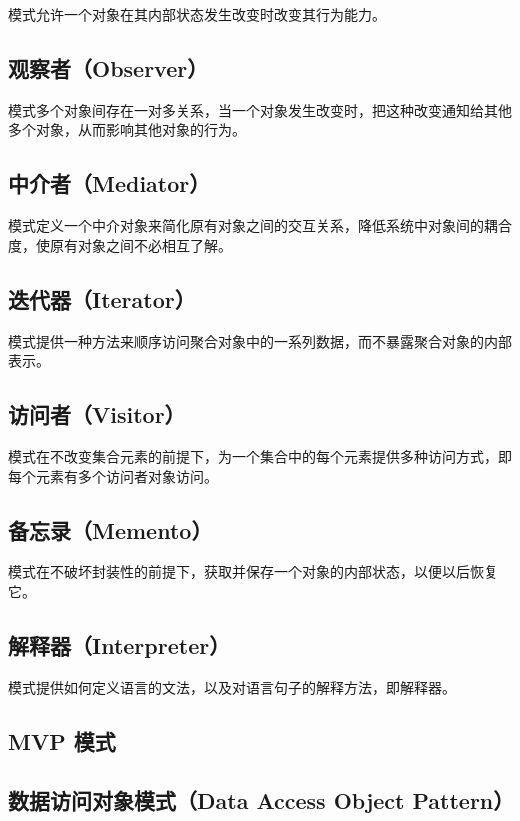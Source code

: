 \documentclass[cn,black,12pt,normal]{elegantnote}
\begin{document}
模式允许一个对象在其内部状态发生改变时改变其行为能力。

\subsection{观察者（Observer）}

模式多个对象间存在一对多关系，当一个对象发生改变时，把这种改变通知给其他多个对象，从而影响其他对象的行为。

\subsection{中介者（Mediator）}

模式定义一个中介对象来简化原有对象之间的交互关系，降低系统中对象间的耦合度，使原有对象之间不必相互了解。


\subsection{迭代器（Iterator）}

模式提供一种方法来顺序访问聚合对象中的一系列数据，而不暴露聚合对象的内部表示。


\subsection{访问者（Visitor）}

模式在不改变集合元素的前提下，为一个集合中的每个元素提供多种访问方式，即每个元素有多个访问者对象访问。


\subsection{备忘录（Memento）}

模式在不破坏封装性的前提下，获取并保存一个对象的内部状态，以便以后恢复它。


\subsection{解释器（Interpreter）}

模式提供如何定义语言的文法，以及对语言句子的解释方法，即解释器。


\subsection{MVP 模式}

\subsection{数据访问对象模式（Data Access Object Pattern）}
\end{document}
